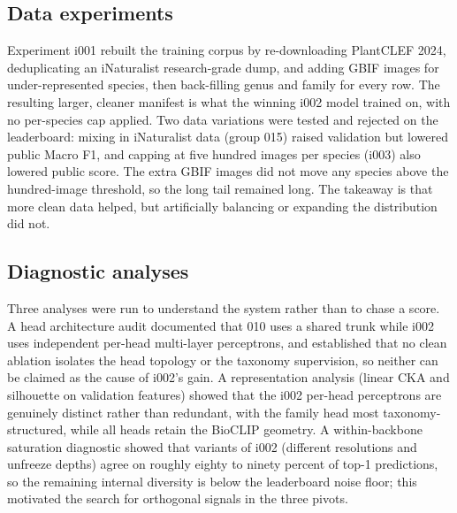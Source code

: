 \subsection{Data experiments}
Experiment i001 rebuilt the training corpus by re-downloading PlantCLEF 2024,
deduplicating an iNaturalist research-grade dump, and adding GBIF images for
under-represented species, then back-filling genus and family for every row. The
resulting larger, cleaner manifest is what the winning i002 model trained on, with no
per-species cap applied. Two data variations were tested and rejected on the
leaderboard: mixing in iNaturalist data (group 015) raised validation but lowered
public Macro F1, and capping at five hundred images per species (i003) also lowered
public score. The extra GBIF images did not move any species above the hundred-image
threshold, so the long tail remained long. The takeaway is that more clean data helped,
but artificially balancing or expanding the distribution did not.

\subsection{Diagnostic analyses}
Three analyses were run to understand the system rather than to chase a score. A head
architecture audit documented that 010 uses a shared trunk while i002 uses independent
per-head multi-layer perceptrons, and established that no clean ablation isolates the
head topology or the taxonomy supervision, so neither can be claimed as the cause of
i002's gain. A representation analysis (linear CKA and silhouette on validation
features) showed that the i002 per-head perceptrons are genuinely distinct rather than
redundant, with the family head most taxonomy-structured, while all heads retain the
BioCLIP geometry. A within-backbone saturation diagnostic showed that variants of i002
(different resolutions and unfreeze depths) agree on roughly eighty to ninety percent
of top-1 predictions, so the remaining internal diversity is below the leaderboard
noise floor; this motivated the search for orthogonal signals in the three pivots.

